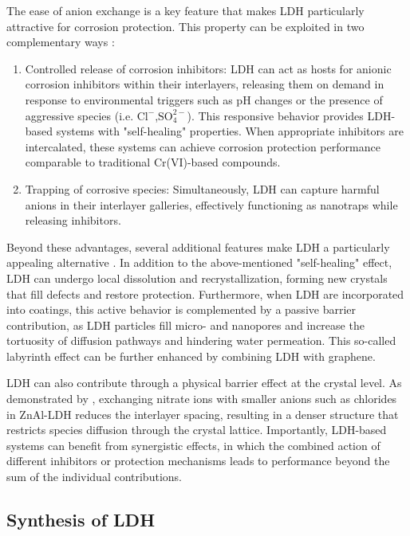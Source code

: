 \documentclass[11pt,twoside,a4paper]{report}
\begin{document}
The ease of anion exchange is a key feature that makes LDH particularly attractive for corrosion protection. This property can be exploited in two complementary ways \cite{Iuzviuk2020,He2020,Cao2022,Zhou2017,Bouali2020}:
\begin{enumerate}
    \item Controlled release of corrosion inhibitors: LDH can act as hosts for anionic corrosion inhibitors within their interlayers, releasing them on demand in response to environmental triggers such as pH changes or the presence of aggressive species (i.e. $\text{Cl}^-$,$\text{SO}_4^{2-}$). This responsive behavior provides LDH-based systems with "self-healing" properties. When appropriate inhibitors are intercalated, these systems can achieve corrosion protection performance comparable to traditional Cr(VI)-based compounds.
    \item Trapping of corrosive species: Simultaneously, LDH can capture harmful anions in their interlayer galleries, effectively functioning as nanotraps while releasing inhibitors.
\end{enumerate}


Beyond these advantages, several additional features make LDH a particularly appealing alternative \cite{Cao2022}. In addition to the above-mentioned "self-healing" effect, LDH can undergo local dissolution and recrystallization, forming new crystals that fill defects and restore protection. Furthermore, when LDH are incorporated into coatings, this active behavior is complemented by a passive barrier contribution, as LDH particles fill micro- and nanopores and increase the tortuosity of diffusion pathways and hindering water permeation. This so-called labyrinth effect can be further enhanced by combining LDH with graphene.

LDH can also contribute through a physical barrier effect at the crystal level. As demonstrated by \citet{Bouali2020}, exchanging nitrate ions with smaller anions such as chlorides in ZnAl-LDH reduces the interlayer spacing, resulting in a denser structure that restricts species diffusion through the crystal lattice. Importantly, LDH-based systems can benefit from synergistic effects, in which the combined action of different inhibitors or protection mechanisms leads to performance beyond the sum of the individual contributions.

\subsection{Synthesis of LDH}
\end{document}
